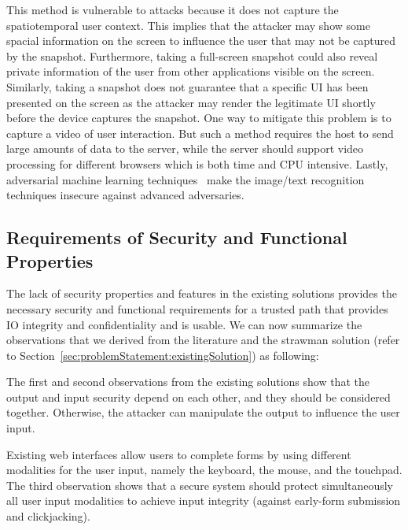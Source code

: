 This method is vulnerable to attacks because it does not capture the spatiotemporal user context. This implies that the attacker may show some spacial information on the screen to influence the user that may not be captured by the snapshot. Furthermore, taking a full-screen snapshot could also reveal private information of the user from other applications visible on the screen. Similarly, taking a snapshot does not guarantee that a specific UI has been presented on the screen as the attacker may render the legitimate UI shortly before the device captures the snapshot.
One way to mitigate this problem is to capture a video of user interaction. But such a method requires the host to send large amounts of data to the server, while the server should support video processing for different browsers which is both time and CPU intensive. Lastly, adversarial machine learning techniques~\cite{eykholt2017robust,sitawarin2018rogue} make the image/text recognition techniques insecure against advanced adversaries.


\subsection{Requirements of Security and Functional Properties}
\label{sec:problemStatement:goals}

The lack of security properties and features in the existing solutions provides the necessary security and functional requirements for a trusted path that provides IO integrity and confidentiality and is usable. We can now summarize the observations that we derived from the literature and the strawman solution (refer to Section~\ref{sec:problemStatement:existingSolution}) as following:

The first and second observations from the existing solutions show that the output and input security depend on each other, and they should be considered together. Otherwise, the attacker can manipulate the output to influence the user input.

Existing web interfaces allow users to complete forms by using different modalities for the user input, namely the keyboard, the mouse, and the touchpad. The third observation shows that a secure system should protect simultaneously all user input modalities to achieve input integrity (against early-form submission and clickjacking).


